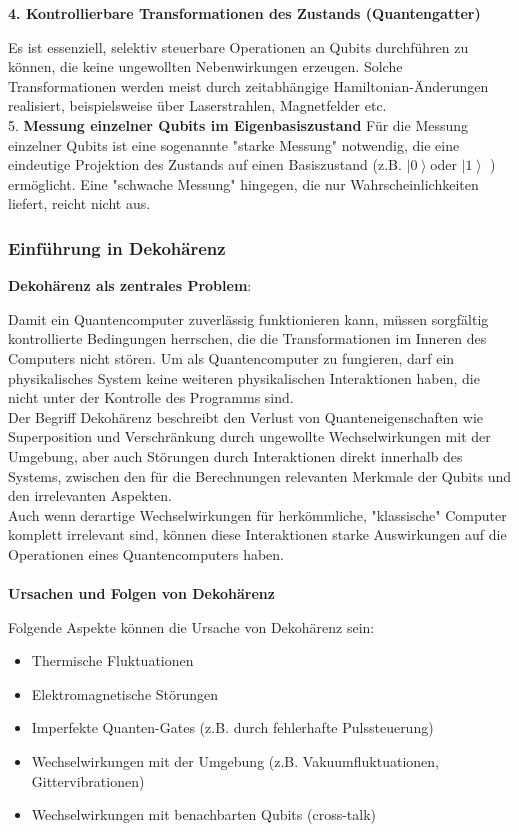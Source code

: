 \textbf{4. Kontrollierbare Transformationen des Zustands (Quantengatter)}

Es ist essenziell, selektiv steuerbare Operationen an Qubits durchführen zu können, die keine ungewollten Nebenwirkungen erzeugen. Solche Transformationen werden meist durch zeitabhängige Hamiltonian-Änderungen realisiert, beispielsweise über Laserstrahlen, Magnetfelder etc. \\


5. \textbf{Messung einzelner Qubits im Eigenbasiszustand} 
Für die Messung einzelner Qubits ist eine sogenannte "starke Messung" notwendig, die eine eindeutige Projektion des Zustands auf einen Basiszustand (z.B.  \(\left| 0\right\rangle\)oder \(\left| 1 \right\rangle\) ) ermöglicht. Eine "schwache Messung" hingegen, die nur Wahrscheinlichkeiten liefert, reicht nicht aus. 

\cite{divincenzo_topics_nodate}
 
\subsubsection{Einführung in Dekohärenz }

\textbf{Dekohärenz als zentrales Problem}: 

Damit ein Quantencomputer zuverlässig funktionieren kann, müssen sorgfältig kontrollierte Bedingungen herrschen, die die Transformationen im Inneren des Computers nicht stören. Um als Quantencomputer zu fungieren, darf ein physikalisches System keine weiteren physikalischen Interaktionen haben, die nicht unter der Kontrolle des Programms sind. \\
Der Begriff Dekohärenz beschreibt den Verlust von Quanteneigenschaften wie Superposition und Verschränkung durch ungewollte Wechselwirkungen mit der Umgebung, aber auch Störungen durch Interaktionen direkt innerhalb des Systems, zwischen den für die Berechnungen relevanten Merkmale der Qubits und den irrelevanten Aspekten. \\
Auch wenn derartige Wechselwirkungen für herkömmliche, "klassische" Computer komplett irrelevant sind, können diese Interaktionen starke Auswirkungen auf die Operationen eines Quantencomputers haben. 
\cite{mermin_quantum_2012}\\
\\
\textbf{Ursachen und Folgen von Dekohärenz}


Folgende Aspekte können die Ursache von Dekohärenz sein:\\
\begin{itemize}
    \item Thermische Fluktuationen
    \item Elektromagnetische Störungen
    \item Imperfekte Quanten-Gates (z.B. durch fehlerhafte Pulssteuerung)
    \item Wechselwirkungen mit der Umgebung (z.B. Vakuumfluktuationen, Gittervibrationen)
    \item Wechselwirkungen mit benachbarten Qubits (cross-talk)
\end{itemize}

